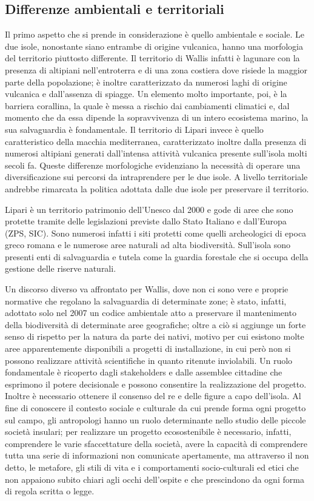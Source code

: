 \documentclass[fleqn,11pt]{SelfArx} %
\begin{document}
\subsection{Differenze ambientali e territoriali}
Il primo aspetto che si prende in considerazione è quello ambientale e sociale. Le due isole, nonostante siano entrambe di origine vulcanica, hanno una morfologia del territorio piuttosto differente. Il territorio di Wallis infatti è lagunare con la presenza di altipiani nell'entroterra e di una zona costiera dove risiede la maggior parte della popolazione; è inoltre caratterizzato da numerosi laghi di origine vulcanica e dall'assenza di spiagge. Un elemento molto importante, poi, è la barriera corallina, la quale è messa a rischio dai cambiamenti climatici e, dal momento che da essa dipende la sopravvivenza di un intero ecosistema marino, la sua salvaguardia è fondamentale. Il territorio di Lipari invece è quello caratteristico della macchia mediterranea, caratterizzato inoltre dalla presenza di numerosi altipiani generati dall'intensa attività vulcanica presente sull'isola molti secoli fa. 
Queste differenze morfologiche evidenziano la necessità di operare una diversificazione sui percorsi da intraprendere per le due isole. A livello territoriale andrebbe rimarcata la politica adottata dalle due isole per preservare il territorio. 

Lipari è un territorio patrimonio dell'Unesco dal 2000 e gode di aree che sono protette tramite delle legislazioni previste dallo Stato Italiano e dall'Europa (ZPS, SIC). Sono numerosi infatti i siti protetti come quelli archeologici di epoca greco romana e le numerose aree naturali ad alta biodiversità. Sull'isola sono presenti enti di salvaguardia e tutela come la guardia forestale che si occupa della gestione delle riserve naturali.

Un discorso diverso va affrontato per Wallis, dove non ci sono vere e proprie normative che regolano la salvaguardia di determinate zone; è stato, infatti, adottato solo nel 2007 un codice ambientale atto a preservare il mantenimento della biodiversità di determinate aree geografiche; oltre a ciò si aggiunge un forte senso di rispetto per la natura da parte dei nativi, motivo per cui esistono molte aree apparentemente disponibili a progetti di installazione, in cui però non si possono realizzare attività scientifiche in quanto ritenute inviolabili. Un ruolo fondamentale è ricoperto dagli stakeholders e dalle assemblee cittadine che esprimono il potere decisionale e possono consentire la realizzazione del progetto. Inoltre è necessario ottenere il consenso del re e delle figure a capo dell'isola. Al fine di conoscere il contesto sociale e culturale da cui prende forma ogni progetto sul campo, gli antropologi hanno un ruolo determinante nello studio delle piccole società insulari; per realizzare un progetto ecosostenibile è necessario, infatti, comprendere le varie sfaccettature della società, avere la capacità di comprendere tutta una serie di informazioni non comunicate apertamente, ma attraverso il non detto, le metafore, gli stili di vita e i comportamenti socio-culturali ed etici che non appaiono subito chiari agli occhi dell'ospite e che prescindono da ogni forma di regola scritta o legge. 
\end{document}
